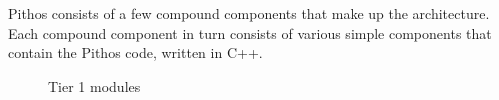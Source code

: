 \documentclass[10pt,a4paper,conference]{IEEEtran}
\begin{document}
Pithos consists of a few compound components that make up the architecture. Each compound component in turn consists of various simple components
that contain the Pithos code, written in C++.

\begin{figure}[htbp]
\centering {}
\caption{Tier 1 modules}
\end{figure}
\end{document}
